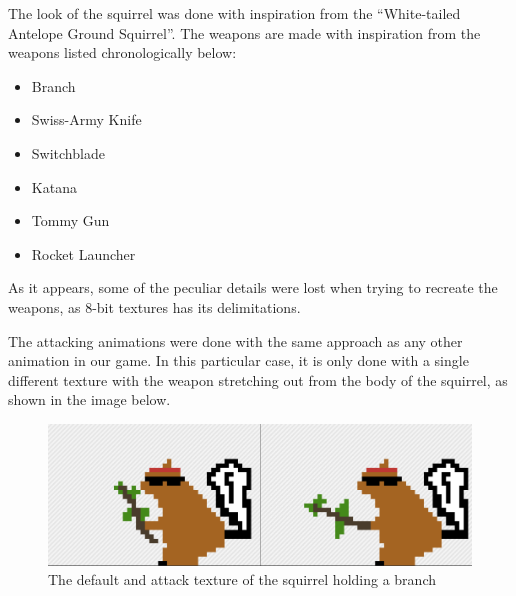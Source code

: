 \documentclass[12p]{article}
\begin{document}
\newpage 
The look of the squirrel was done with inspiration from the “White-tailed Antelope Ground Squirrel”. The weapons are made with inspiration from the weapons listed chronologically below:

 \begin{itemize}
        \item Branch
    \end{itemize}
    
    \begin{itemize}
        \item Swiss-Army Knife 
    \end{itemize}
    
    \begin{itemize}
        \item Switchblade
    \end{itemize}
    
    \begin{itemize}
        \item Katana
    \end{itemize}
    
    \begin{itemize}
        \item Tommy Gun
    \end{itemize}
    
    \begin{itemize}
        \item Rocket Launcher
    \end{itemize}

As it appears, some of the peculiar details were lost when trying to recreate the weapons, as 8-bit textures has its delimitations. 

The attacking animations were done with the same approach as any other animation in our game. In this particular case, it is only done with a single different texture with the weapon stretching out from the body of the squirrel, as shown in the image below.

\begin{figure}[ht]
  \center
  \includegraphics[width=1\textwidth]{Documentation/Picture2.png}
  \caption{The default and attack texture of the squirrel holding a branch}
  \label{fig:squirrel_branch_default_attack_texture}
\end{figure}
\end{document}
